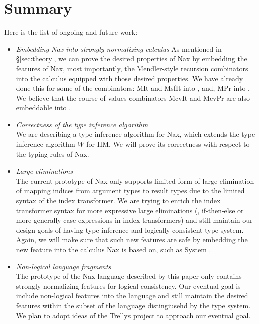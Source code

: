 \section{Summary}

Here is the list of ongoing and future work:
\begin{itemize}
\item \emph{Embedding Nax into strongly normalizing calculus}
	As mentioned in \S\ref{sec:theory}, we can prove the desired properties
	of Nax by embedding the features of Nax, most importantly,
	the Mendler-style recursion combinators into the calculus
	equipped with those desired properties. We have already done this for
	some of the combinators: \textsf{MIt} and \textsf{MsfIt} into \Fi, and,
	\textsf{MPr} into \Fixi. We believe that the course-of-values
	combinators \textsf{McvIt} and \textsf{McvPr} are also embeddable
	into \Fixi.
\item \emph{Correctness of the type inference algorithm}\\
	We are describing a type inference algorithm for Nax,
	which extends the type inference algorithm $W$ for HM.
	We will prove its correctness with respect to the typing rules of Nax.
\item \emph{Large eliminations}\\
	The current prototype of Nax only supports limited
	form of large elimination of mapping indices from
	argument types to result types due to the limited syntax
	of the index transformer. We are trying to enrich the index
	transformer syntax for more expressive large eliminations
	(\eg, if-then-else or more generally case expressions
	in index transformers) and still maintain our design goals of
	having type inference and logically consistent type system.
	Again, we will make sure that such new features are safe by embedding
	the new feature into the calculus Nax is based on, such as System \Fi.
\item \emph{Non-logical language fragments}\\
	The prototype of the Nax language described by this paper
	only contains strongly normalizing features for logical consistency.
	Our eventual goal is include non-logical features into the language
	and still maintain the desired features within the subset of
	the language distingiusehd by the type system. We plan to
	adopt ideas of the Trellys project
	\cite{plpv12TrellysEq,msfp12TrellysHEq,msfp12TrellysSN4GenRec}
	to approach our eventual goal.
\end{itemize}

